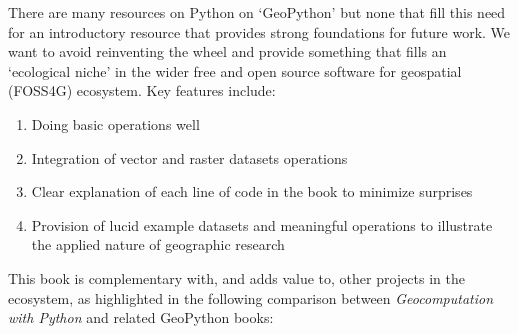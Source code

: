\documentclass[
  letterpaper,
]{krantz}
\providecommand{\tightlist}{%
  \setlength{\itemsep}{0pt}\setlength{\parskip}{0pt}}\usepackage{longtable,booktabs,array}
\begin{document}
There are many resources on Python on `GeoPython' but none that fill
this need for an introductory resource that provides strong foundations
for future work. We want to avoid reinventing the wheel and provide
something that fills an `ecological niche' in the wider free and open
source software for geospatial (FOSS4G) ecosystem. Key features include:

\begin{enumerate}
\def\labelenumi{\arabic{enumi}.}
\tightlist
\item
  Doing basic operations well
\item
  Integration of vector and raster datasets operations
\item
  Clear explanation of each line of code in the book to minimize
  surprises
\item
  Provision of lucid example datasets and meaningful operations to
  illustrate the applied nature of geographic research
\end{enumerate}

This book is complementary with, and adds value to, other projects in
the ecosystem, as highlighted in the following comparison between
\emph{Geocomputation with Python} and related GeoPython books:
\end{document}

